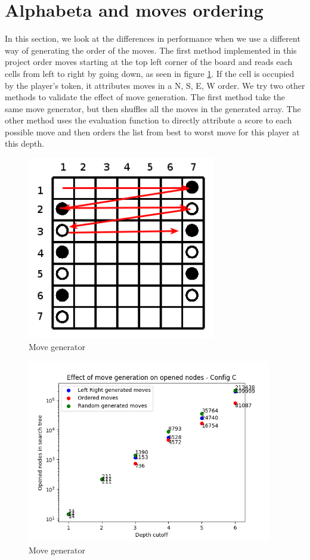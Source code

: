 \documentclass{article}
\begin{document}
\section{Alphabeta and moves ordering}
In this section, we look at the differences in performance when we use a different way of generating the order of the moves. The first method implemented in this project order moves starting at the top left corner of the board and reads each cells from left to right by going down, as seen in figure \ref{fig:movesleftright}. If the cell is occupied by the player's token, it attributes moves in a N, S, E, W order. 
We try two other methods to validate the effect of move generation. The first method take the same move generator, but then shuffles all the moves in the generated array.
The other method uses the evaluation function to directly attribute a score to each possible move and then orders the list from best to worst move for this player at this depth.
	\begin{figure}
		\hfill\includegraphics[height=8cm]{movesleftright.png}\hspace*{\fill}
		\caption{ Move generator}
		\label{fig:movesleftright}
	\end{figure}
	\begin{figure}
		\hfill\includegraphics[height=8cm]{all_gen_moves.png}\hspace*{\fill}
		\caption{ Move generator}
		\label{fig:movesrand}
	\end{figure}
	
\end{document}
